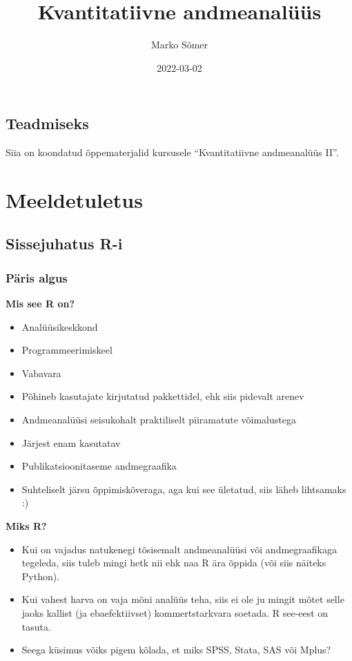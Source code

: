\documentclass[
]{book}
\title{Kvantitatiivne andmeanalüüs}
\author{Marko Sõmer}
\date{2022-03-02}
\providecommand{\tightlist}{%
  \setlength{\itemsep}{0pt}\setlength{\parskip}{0pt}}
\begin{document}
\maketitle

{
\setcounter{tocdepth}{1}
\tableofcontents
}
\hypertarget{teadmiseks}{%
\chapter{Teadmiseks}\label{teadmiseks}}

Siia on koondatud õppematerjalid kursusele ``Kvantitatiivne andmeanalüüs II''.

\hypertarget{part-meeldetuletus}{%
\part{Meeldetuletus}\label{part-meeldetuletus}}

\hypertarget{sissejuhatus-r-i}{%
\chapter{Sissejuhatus R-i}\label{sissejuhatus-r-i}}

\hypertarget{puxe4ris-algus}{%
\section{Päris algus}\label{puxe4ris-algus}}

\textbf{Mis see R on?}

\begin{itemize}
\tightlist
\item
  Analüüsikeskkond
\item
  Programmeerimiskeel
\item
  Vabavara
\item
  Põhineb kasutajate kirjutatud pakkettidel, ehk siis pidevalt arenev
\item
  Andmeanalüüsi seisukohalt praktiliselt piiramatute võimalustega
\item
  Järjest enam kasutatav
\item
  Publikatsioonitaseme andmegraafika
\item
  Suhteliselt järsu õppimiskõveraga, aga kui see ületatud, siis läheb lihtsamaks :)
\end{itemize}

\textbf{Miks R?}

\begin{itemize}
\tightlist
\item
  Kui on vajadus natukenegi tõsisemalt andmeanalüüsi või andmegraafikaga tegeleda, siis tuleb mingi hetk nii ehk naa R ära õppida (või siis näiteks Python).
\item
  Kui vahest harva on vaja mõni analüüs teha, siis ei ole ju mingit mõtet selle jaoks kallist (ja ebaefektiivset) kommertstarkvara soetada. R see-eest on tasuta.
\item
  Seega küsimus võiks pigem kõlada, et miks SPSS, Stata, SAS või Mplus?
\end{itemize}
\end{document}
